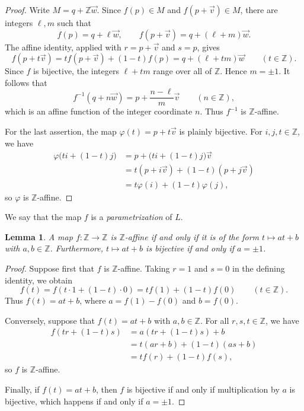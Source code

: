 \documentclass[12pt,letterpaper]{article}
\numberwithin{equation}{section}
\newcommand{\Z}{\mathbb Z}
\theoremstyle{plain}
\newtheorem{lemma}[theorem]{Lemma}
\theoremstyle{definition}
\begin{document}
\begin{proof}
Write $M=q+\Z\vec w$. Since $f(p)\in M$ and $f(p+\vec v)\in M$, there are integers $\ell,m$ such that
\[
 f(p)=q+\ell\vec w,\qquad
 f(p+\vec v)=q+(\ell+m)\vec w.
\]
The affine identity, applied with $r=p+\vec v$ and $s=p$, gives
\[
 f(p+t\vec v)=t f(p+\vec v)+(1-t)f(p)
             =q+(\ell+tm)\vec w
 \qquad(t\in\Z).
\]
Since $f$ is bijective, the integers $\ell+tm$ range over all of $\Z$. Hence $m=\pm1$. It follows that
\[
 f^{-1}(q+n\vec w)=p+\frac{n-\ell}{m}\vec v
 \qquad(n\in\Z),
\]
which is an affine function of the integer coordinate $n$. Thus $f^{-1}$ is $\Z$-affine.

For the last assertion, the map $\varphi(t)=p+t\vec v$ is plainly bijective. For $i,j,t\in\Z$, we have
\[
 \begin{aligned}
 \varphi\bigl(ti+(1-t)j\bigr)
 &=p+\bigl(ti+(1-t)j\bigr)\vec v\\
 &=t(p+i\vec v)+(1-t)(p+j\vec v)\\
 &=t\varphi(i)+(1-t)\varphi(j),
 \end{aligned}
\]
so $\varphi$ is $\Z$-affine.
\end{proof}

We say that the map $f$ is a \emph{parametrization} of $L$.

\begin{lemma}\label{lem:endo}
A map $f:\Z\to\Z$ is $\Z$-affine if and only if it is of the form $t\mapsto at+b$ with $a,b\in\Z$. Furthermore, $t\mapsto at+b$ is bijective if and only if $a=\pm1$.
\end{lemma}

\begin{proof}
Suppose first that $f$ is $\Z$-affine. Taking $r=1$ and $s=0$ in the defining identity, we obtain
\[
 f(t)=f(t\cdot1+(1-t)\cdot0)
     =tf(1)+(1-t)f(0)
 \qquad(t\in\Z).
\]
Thus $f(t)=at+b$, where $a=f(1)-f(0)$ and $b=f(0)$.

Conversely, suppose that $f(t)=at+b$ with $a,b\in\Z$. For all $r,s,t\in\Z$, we have
\[
 \begin{aligned}
 f(tr+(1-t)s)
 &=a(tr+(1-t)s)+b\\
 &=t(ar+b)+(1-t)(as+b)\\
 &=tf(r)+(1-t)f(s),
 \end{aligned}
\]
so $f$ is $\Z$-affine.

Finally, if $f(t)=at+b$, then $f$ is bijective if and only if multiplication by $a$ is bijective, which happens if and only if $a=\pm1$.
\end{proof}
\end{document}

